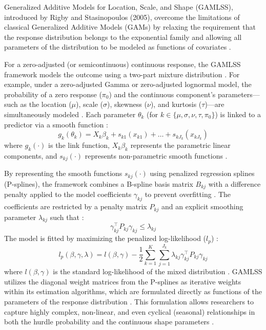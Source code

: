 Generalized Additive Models for Location, Scale, and Shape (GAMLSS), introduced by Rigby and Stasinopoulos (2005), overcome the limitations of classical Generalized Additive Models (GAMs) by relaxing the requirement that the response distribution belongs to the exponential family and allowing all parameters of the distribution to be modeled as functions of covariates \cite{rigby2005, stasinopoulos2017}. 

For a zero-adjusted (or semicontinuous) continuous response, the GAMLSS framework models the outcome using a two-part mixture distribution \cite{stasinopoulos2017}. For example, under a zero-adjusted Gamma or zero-adjusted lognormal model, the probability of a zero response ($\pi_0$) and the continuous component's parameters—such as the location ($\mu$), scale ($\sigma$), skewness ($\nu$), and kurtosis ($\tau$)—are simultaneously modeled \cite{stasinopoulos2017}. Each parameter $\theta_k$ (for $k \in \{\mu, \sigma, \nu, \tau, \pi_0\}$) is linked to a predictor via a smooth function \cite{stasinopoulos2017}:
\[
g_k(\theta_k) = X_k \beta_k + s_{k1}(x_{k1}) + \dots + s_{kJ_k}(x_{kJ_k})
\]
where $g_k(\cdot)$ is the link function, $X_k \beta_k$ represents the parametric linear components, and $s_{kj}(\cdot)$ represents non-parametric smooth functions \cite{stasinopoulos2017}.

By representing the smooth functions $s_{kj}(\cdot)$ using penalized regression splines (P-splines), the framework combines a B-spline basis matrix $B_{kj}$ with a difference penalty applied to the model coefficients $\gamma_{kj}$ to prevent overfitting \cite{rigby2005, stasinopoulos2017}. The coefficients are restricted by a penalty matrix $P_{kj}$ and an explicit smoothing parameter $\lambda_{kj}$ such that \cite{stasinopoulos2017}:
\[
\gamma_{kj}^\top P_{kj}\gamma_{kj} \le \lambda_{kj}
\]
The model is fitted by maximizing the penalized log-likelihood ($l_p$) \cite{stasinopoulos2017}:
\[
l_p(\beta, \gamma, \lambda) = l(\beta, \gamma) - \frac{1}{2} \sum_{k=1}^K \sum_{j=1}^{J_k} \lambda_{kj}\gamma_{kj}^\top P_{kj}\gamma_{kj}
\]
where $l(\beta, \gamma)$ is the standard log-likelihood of the mixed distribution \cite{stasinopoulos2017}. GAMLSS utilizes the diagonal weight matrices from the P-splines as iterative weights within its estimation algorithms, which are formulated directly as functions of the parameters of the response distribution \cite{stasinopoulos2017}. This formulation allows researchers to capture highly complex, non-linear, and even cyclical (seasonal) relationships in both the hurdle probability and the continuous shape parameters \cite{stasinopoulos2017, wood2006}.

